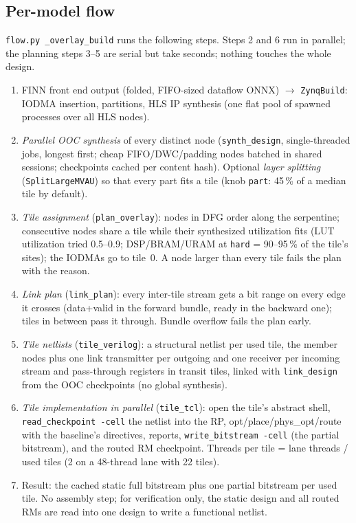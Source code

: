 \documentclass[10pt,twocolumn]{article}
\newcommand{\code}[1]{\texttt{\small #1}}
\begin{document}
\subsection{Per-model flow}
\code{flow.py \_overlay\_build} runs the following steps. Steps 2 and 6 run in parallel; the
planning steps 3--5 are serial but take seconds; nothing touches the whole design.
\begin{enumerate}\setlength{\itemsep}{0pt}
\item FINN front end output (folded, FIFO-sized dataflow ONNX) $\to$ \code{ZynqBuild}: IODMA
insertion, partitions, HLS IP synthesis (one flat pool of spawned processes over all HLS nodes).
\item \emph{Parallel OOC synthesis} of every distinct node (\code{synth\_design}, single-threaded
jobs, longest first; cheap FIFO/DWC/padding nodes batched in shared sessions; checkpoints cached
per content hash). Optional \emph{layer splitting} (\code{SplitLargeMVAU}) so that every part fits a
tile (knob \code{part}: 45\,\% of a median tile by default).
\item \emph{Tile assignment} (\code{plan\_overlay}): nodes in DFG order along the serpentine;
consecutive nodes share a tile while their synthesized utilization fits (LUT utilization tried
0.5--0.9; DSP/BRAM/URAM at \code{hard} = 90--95\,\% of the tile's sites); the IODMAs go to
tile~0. A node larger than every tile fails the plan with the reason.
\item \emph{Link plan} (\code{link\_plan}): every inter-tile stream gets a bit range on every
edge it crosses (data+valid in the forward bundle, ready in the backward one); tiles in between
pass it through. Bundle overflow fails the plan early.
\item \emph{Tile netlists} (\code{tile\_verilog}): a structural netlist per used tile, the member
nodes plus one link transmitter per outgoing and one receiver per incoming stream and pass-through
registers in transit tiles, linked with \code{link\_design} from the OOC checkpoints (no global
synthesis).
\item \emph{Tile implementation in parallel} (\code{tile\_tcl}): open the tile's abstract shell,
\code{read\_checkpoint -cell} the netlist into the RP, opt/place/phys\_opt/route with the
baseline's directives, reports, \code{write\_bitstream -cell} (the partial bitstream), and the
routed RM checkpoint. Threads per tile = lane threads / used tiles (2 on a 48-thread lane with 22
tiles).
\item Result: the cached static full bitstream plus one partial bitstream per used tile. No
assembly step; for verification only, the static design and all routed RMs are read into one
design to write a functional netlist.
\end{enumerate}
\end{document}
